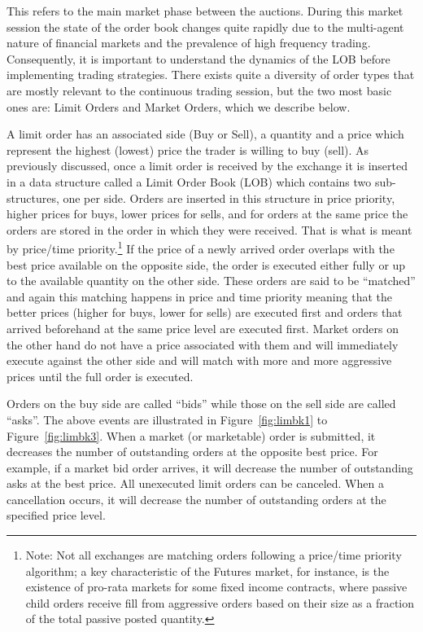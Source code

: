 This refers to the main market phase between the auctions. During this market session  the state of the order book changes quite rapidly due to the multi-agent nature of financial markets and the prevalence of high frequency trading. Consequently, it is important to understand the dynamics of the LOB before implementing trading strategies. There exists quite a diversity of order types that are mostly relevant to the continuous trading session, but the two most basic ones are: Limit Orders and Market Orders, which we describe below. 


A limit order has an associated side (Buy or Sell), a quantity and a price which represent the highest (lowest) price the trader is willing to buy (sell). As previously discussed, once a limit order is received by the exchange it is inserted in a data structure called a Limit Order Book (LOB) which contains two sub-structures, one per side. Orders are inserted in this structure in price priority, higher prices for buys, lower prices for sells, and for orders at the same price the orders are stored in the order in which they were received. That is what is meant by price/time priority.\footnote{Note: Not all exchanges are matching orders following a price/time priority algorithm; a key characteristic of the Futures market, for instance, is the existence of pro-rata markets for some fixed income contracts, where passive child orders receive fill from aggressive orders based on their size as a fraction of the total passive posted quantity.} If the price of a newly arrived order overlaps with the best price available on the opposite side, the order is executed either fully or up to the available quantity on the other side. These orders are said to be ``matched'' and again this matching happens in price and time priority meaning that the better prices (higher for buys, lower for sells) are executed first and orders that arrived beforehand at the same price level are executed first. Market orders on the other hand do not have a price associated with them and will immediately execute against the other side and will match with more and more aggressive prices until the full order is executed. 


Orders on the buy side are called ``bids'' while those on the sell side are called ``asks''. The above events are illustrated in Figure~\ref{fig:limbk1} to Figure~\ref{fig:limbk3}. When a market (or marketable) order is submitted, it decreases the number of outstanding orders at the opposite best price. For example, if a market bid order arrives, it will decrease the number of outstanding asks at the best price. All unexecuted limit orders can be canceled. When a cancellation occurs, it will decrease the number of outstanding orders at the specified price level.
	
